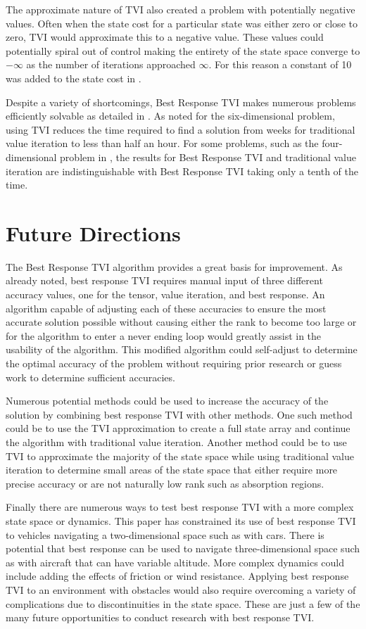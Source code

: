 The approximate nature of TVI also created a problem with potentially negative values. Often when the state cost for a particular state was either zero or close to zero, TVI would approximate this to a negative value. These values could potentially spiral out of control making the entirety of the state space converge to $-\infty$ as the number of iterations approached $\infty$. For this reason a constant of 10 was added to the state cost in .

Despite a variety of shortcomings, Best Response TVI makes numerous problems efficiently solvable as detailed in . As noted for the six-dimensional problem, using TVI reduces the time required to find a solution from weeks for traditional value iteration to less than half an hour. For some problems, such as the four-dimensional problem in , the results for Best Response TVI and traditional value iteration are indistinguishable with Best Response TVI taking only a tenth of the time.           

\section{Future Directions}
The Best Response TVI algorithm provides a great basis for improvement. As already noted, best response TVI requires manual input of three different accuracy values, one for the tensor, value iteration, and best response. An algorithm capable of adjusting each of these accuracies to ensure the most accurate solution possible without causing either the rank to become too large or for the algorithm to enter a never ending loop would greatly assist in the usability of the algorithm. This modified algorithm could self-adjust to determine the optimal accuracy of the problem without requiring prior research or guess work to determine sufficient accuracies.

Numerous potential methods could be used to increase the accuracy of the solution by combining best response TVI with other methods. One such method could be to use the TVI approximation to create a full state array and continue the algorithm with traditional value iteration. Another method could be to use TVI to approximate the majority of the state space while using traditional value iteration to determine small areas of the state space that either require more precise accuracy or are not naturally low rank such as absorption regions.

Finally there are numerous ways to test best response TVI with a more complex state space or dynamics. This paper has constrained its use of best response TVI to vehicles navigating a two-dimensional space such as with cars. There is potential that best response can be used to navigate three-dimensional space such as with aircraft that can have variable altitude. More complex dynamics could include adding the effects of friction or wind resistance. Applying best response TVI to an environment with obstacles would also require overcoming a variety of complications due to discontinuities in the state space. These are just a few of the many future opportunities to conduct research with best response TVI.    


